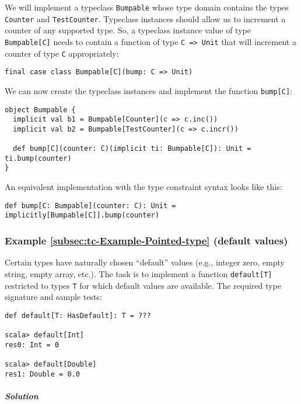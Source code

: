 We will implement a typeclass \lstinline!Bumpable! whose type domain
contains the types \lstinline!Counter! and \lstinline!TestCounter!.
Typeclass instances should allow us to increment a counter of any
supported type. So, a typeclass instance value of type \lstinline!Bumpable[C]!
needs to contain a function of type \lstinline!C => Unit! that will
increment a counter of type \lstinline!C! appropriately:
\begin{lstlisting}
final case class Bumpable[C](bump: C => Unit)
\end{lstlisting}
We can now create the typeclass instances and implement the function
\lstinline!bump[C]!:
\begin{lstlisting}
object Bumpable {
  implicit val b1 = Bumpable[Counter](c => c.inc())
  implicit val b2 = Bumpable[TestCounter](c => c.incr())
  
  def bump[C](counter: C)(implicit ti: Bumpable[C]): Unit = ti.bump(counter)
}
\end{lstlisting}
An equivalent implementation with the type constraint syntax looks
like this:
\begin{lstlisting}
def bump[C: Bumpable](counter: C): Unit = implicitly[Bumpable[C]].bump(counter)
\end{lstlisting}


\subsubsection{Example \label{subsec:tc-Example-Pointed-type}\ref{subsec:tc-Example-Pointed-type}
(default values)}

Certain types have naturally chosen \textsf{``}default\textsf{''} values (e.g., integer
zero, empty string, empty array, etc.). The task is to implement a
function \lstinline!default[T]! restricted to types \lstinline!T!
for which default values are available. The required type signature
and sample tests:
\begin{lstlisting}
def default[T: HasDefault]: T = ???

scala> default[Int]
res0: Int = 0

scala> default[Double]
res1: Double = 0.0
\end{lstlisting}


\subparagraph{Solution}

